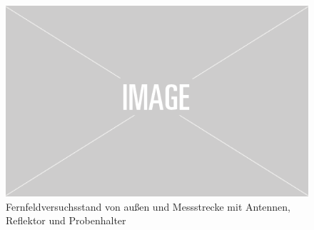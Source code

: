 \begin{figure}[ht]
    \centering
    \includegraphics[width=.6\textwidth]{Abbildungen/placeholder.png}
    \caption{Fernfeldversuchsstand von außen und Messstrecke mit Antennen, Reflektor und Probenhalter}
    \label{fig:3_Gesamtversuchsstand}
\end{figure}




